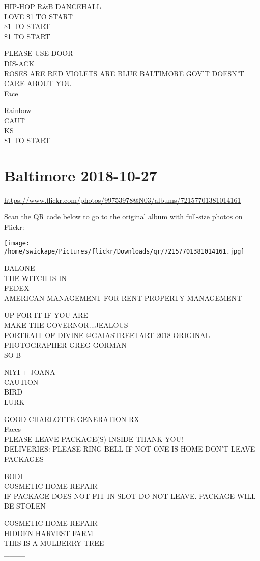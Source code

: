\documentclass[10pt,letterpaper]{article}
\begin{document}
HIP{-}HOP R\&B DANCEHALL\\
LOVE \$1 TO START\\
\$1 TO START\\
\$1 TO START

PLEASE USE DOOR\\
DIS{-}ACK\\
ROSES ARE RED VIOLETS ARE BLUE BALTIMORE GOV'T DOESN'T CARE ABOUT YOU\\
Face

Rainbow\\
CAUT\\
KS\\
\$1 TO START


\section*{Baltimore 2018-10-27}

\url{https://www.flickr.com/photos/99753978@N03/albums/72157701381014161}

Scan the QR code below to go to the original album with full-size photos on Flickr:

\texttt{[image: /home/swickape/Pictures/flickr/Downloads/qr/72157701381014161.jpg]}


DALONE\\
THE WITCH IS IN\\
FEDEX\\
AMERICAN MANAGEMENT FOR RENT PROPERTY MANAGEMENT

UP FOR IT IF YOU ARE\\
MAKE THE GOVERNOR...JEALOUS\\
PORTRAIT OF DIVINE @GAIASTREETART 2018 ORIGINAL PHOTOGRAPHER GREG GORMAN\\
SO B

NIYI + JOANA\\
CAUTION\\
BIRD\\
LURK

GOOD CHARLOTTE GENERATION RX\\
Faces\\
PLEASE LEAVE PACKAGE(S) INSIDE THANK YOU!\\
DELIVERIES: PLEASE RING BELL IF NOT ONE IS HOME DON'T LEAVE PACKAGES

BODI\\
COSMETIC HOME REPAIR\\
IF PACKAGE DOES NOT FIT IN SLOT DO NOT LEAVE.  PACKAGE WILL BE STOLEN

COSMETIC HOME REPAIR\\
HIDDEN HARVEST FARM\\
THIS IS A MULBERRY TREE\\
\_\_\_\_
\end{document}
